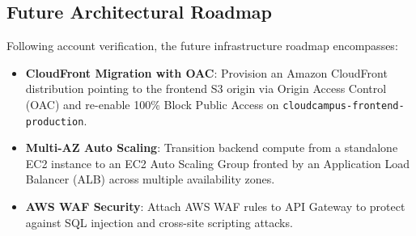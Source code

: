 \subsection{Future Architectural Roadmap}
Following account verification, the future infrastructure roadmap encompasses:
\begin{itemize}[leftmargin=*,itemsep=1pt]
    \item \textbf{CloudFront Migration with OAC}: Provision an Amazon CloudFront distribution pointing to the frontend S3 origin via Origin Access Control (OAC) and re-enable 100\% Block Public Access on \texttt{cloudcampus-frontend-production}.
    \item \textbf{Multi-AZ Auto Scaling}: Transition backend compute from a standalone EC2 instance to an EC2 Auto Scaling Group fronted by an Application Load Balancer (ALB) across multiple availability zones.
    \item \textbf{AWS WAF Security}: Attach AWS WAF rules to API Gateway to protect against SQL injection and cross-site scripting attacks.
\end{itemize}
